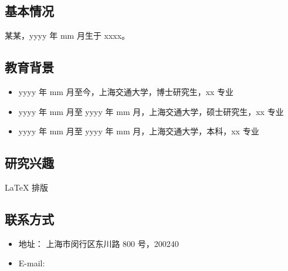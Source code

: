 ﻿%

\begin{resume}
  \subsection*{基本情况}
    某某，yyyy 年 mm 月生于 xxxx。

  \subsection*{教育背景}
  \begin{itemize}
    \item yyyy 年 mm 月至今，上海交通大学，博士研究生，xx 专业
    \item yyyy 年 mm 月至 yyyy 年 mm 月，上海交通大学，硕士研究生，xx 专业
    \item yyyy 年 mm 月至 yyyy 年 mm 月，上海交通大学，本科，xx 专业
  \end{itemize}

  \subsection*{研究兴趣}
    \LaTeX{} 排版

  \subsection*{联系方式}
  \begin{itemize}
    \item 地址： 上海市闵行区东川路 800 号，200240
    \item E-mail: 
  \end{itemize}
\end{resume}
